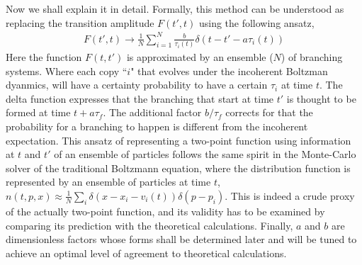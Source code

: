 Now we shall explain it in detail.
Formally, this method can be understood as replacing the transition amplitude $F(t',t)$ using the following ansatz,
\begin{eqnarray}
F(t', t) \rightarrow \frac{1}{N}\sum_{i=1}^N \frac{b}{\tau_i(t)} \delta(t-t'- a \tau_i(t))
\end{eqnarray}
Here the function $F(t, t')$ is approximated by an ensemble ($N$) of branching systems.
Where each copy ``$i$" that evolves under the incoherent Boltzman dyanmics, will have a certainty probability to have a certain $\tau_i$ at time $t$.
The delta function expresses that the branching that start at time $t'$  is thought to be formed at time $t+a\tau_f$.
The additional factor $b/\tau_f$ corrects for that the probability for a branching to happen is different from the incoherent expectation.
This ansatz of representing a two-point function using information at $t$ and $t'$ of an ensemble of particles follows the same spirit in the Monte-Carlo solver of the traditional Boltzmann equation, where the distribution function is represented by an ensemble of particles at time $t$, $n(t, p, x) \approx \frac{1}{N}\sum_i \delta(x-x_i-v_i(t)) \delta(p-p_i)$.
This is indeed a crude proxy of the actually two-point function, and its validity has to be examined by comparing its prediction with the theoretical calculations.
Finally, $a$ and $b$ are dimensionless factors whose forms shall be determined later and will be tuned to achieve an optimal level of agreement to theoretical calculations.

